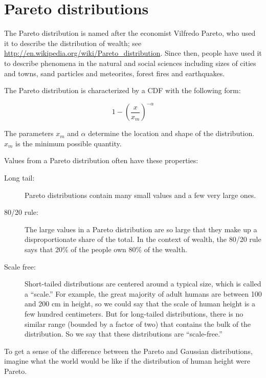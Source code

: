 \documentclass[10pt]{book}
\begin{document}
\section{Pareto distributions}

The Pareto distribution is named after the economist Vilfredo
Pareto, who used it to describe the distribution of wealth;
see \url{http://en.wikipedia.org/wiki/Pareto_distribution}.  Since then,
people have used it to describe
phenomena in the natural and social sciences
including sizes of cities and towns, sand particles
and meteorites, forest fires and earthquakes.

The Pareto distribution is characterized by a CDF with the following
form:

\[ 1- \left( \frac{x}{x_m} \right) ^{-\alpha} \]

The parameters $x_m$ and $\alpha$ determine the location and shape of
the distribution.  $x_m$ is the minimum possible quantity.

Values from a Pareto distribution often have these properties:

\begin{description}

\item[Long tail:] Pareto distributions contain many small values
and a few very large ones.

\item[80/20 rule:] The large values in a Pareto distribution are
so large that they make up a disproportionate share of the total.
In the context of wealth, the 80/20 rule says that 20\% of the
people own 80\% of the wealth.

\item[Scale free:] Short-tailed distributions are centered around
a typical size, which is called a ``scale.''  For example, the
great majority of adult humans are between 100 and 200 cm in height,
so we could say that the scale of human height is a few hundred
centimeters.  But for long-tailed distributions, there is no
similar range (bounded by a factor of two) that contains the
bulk of the distribution.  So we say that these distributions
are ``scale-free.''

\end{description}

To get a sense of the difference between the Pareto and Gaussian
distributions, imagine what the world would be like if the
distribution of human height were Pareto.
\end{document}
